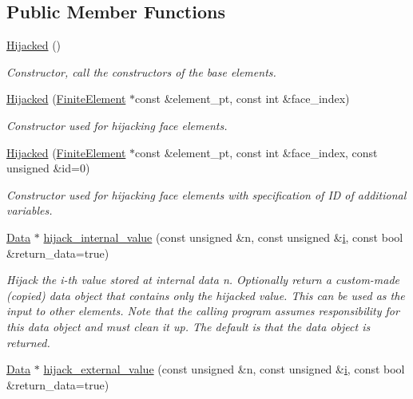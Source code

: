 \subsection*{Public Member Functions}
\begin{DoxyCompactItemize}
\item 
\hyperlink{classoomph_1_1Hijacked_aaf792ec7672bf812fdc5b3e74c31f807}{Hijacked} ()
\begin{DoxyCompactList}\small\item\em Constructor, call the constructors of the base elements. \end{DoxyCompactList}\item 
\hyperlink{classoomph_1_1Hijacked_a5e4aa47011d8141757f9ecbd8f787811}{Hijacked} (\hyperlink{classoomph_1_1FiniteElement}{Finite\+Element} $\ast$const \&element\+\_\+pt, const int \&face\+\_\+index)
\begin{DoxyCompactList}\small\item\em Constructor used for hijacking face elements. \end{DoxyCompactList}\item 
\hyperlink{classoomph_1_1Hijacked_ac03d9be9ce8252556d41ef643b3658be}{Hijacked} (\hyperlink{classoomph_1_1FiniteElement}{Finite\+Element} $\ast$const \&element\+\_\+pt, const int \&face\+\_\+index, const unsigned \&id=0)
\begin{DoxyCompactList}\small\item\em Constructor used for hijacking face elements with specification of ID of additional variables. \end{DoxyCompactList}\item 
\hyperlink{classoomph_1_1Data}{Data} $\ast$ \hyperlink{classoomph_1_1Hijacked_a835ce930b91c2c138f3b4de12aeba216}{hijack\+\_\+internal\+\_\+value} (const unsigned \&n, const unsigned \&\hyperlink{cfortran_8h_adb50e893b86b3e55e751a42eab3cba82}{i}, const bool \&return\+\_\+data=true)
\begin{DoxyCompactList}\small\item\em Hijack the i-\/th value stored at internal data n. Optionally return a custom-\/made (copied) data object that contains only the hijacked value. This can be used as the input to other elements. Note that the calling program assumes responsibility for this data object and must clean it up. The default is that the data object is returned. \end{DoxyCompactList}\item 
\hyperlink{classoomph_1_1Data}{Data} $\ast$ \hyperlink{classoomph_1_1Hijacked_a9e11fa249f667b130e93af9379322182}{hijack\+\_\+external\+\_\+value} (const unsigned \&n, const unsigned \&\hyperlink{cfortran_8h_adb50e893b86b3e55e751a42eab3cba82}{i}, const bool \&return\+\_\+data=true)

\end{DoxyCompactItemize}
